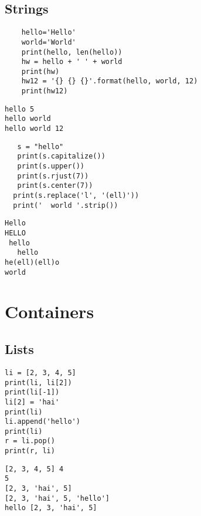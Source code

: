 \subsection{Strings}
\vspace{-.75cm}
\begin{code}
\begin{lstlisting}
    hello='Hello'
    world='World'
    print(hello, len(hello))
    hw = hello + ' ' + world 
    print(hw)
    hw12 = '{} {} {}'.format(hello, world, 12) 
    print(hw12)
\end{lstlisting}
\end{code}
\vspace{-1cm}
\begin{verbatim}
hello 5
hello world
hello world 12

\end{verbatim}
\vspace{-.75cm}
\begin{code}
\begin{lstlisting}
   s = "hello"
   print(s.capitalize())
   print(s.upper()) 
   print(s.rjust(7))    
   print(s.center(7)) 
  print(s.replace('l', '(ell)'))
  print('  world '.strip())
\end{lstlisting}
\end{code}
\vspace{-1cm}
\begin{verbatim}
Hello
HELLO
 hello
   hello
he(ell)(ell)o
world
\end{verbatim}
\vspace{-.75cm}
\section{Containers}
\vspace{-.4cm}
\subsection{Lists}
\vspace{-.45cm}
\begin{code}
\begin{lstlisting}
li = [2, 3, 4, 5]
print(li, li[2])
print(li[-1]) 
li[2] = 'hai'
print(li)
li.append('hello')
print(li)
r = li.pop()
print(r, li)
\end{lstlisting}
\end{code}
\vspace{-.75cm}
\begin{verbatim}
[2, 3, 4, 5] 4
5
[2, 3, 'hai', 5]
[2, 3, 'hai', 5, 'hello']
hello [2, 3, 'hai', 5]
\end{verbatim}
\newpage
